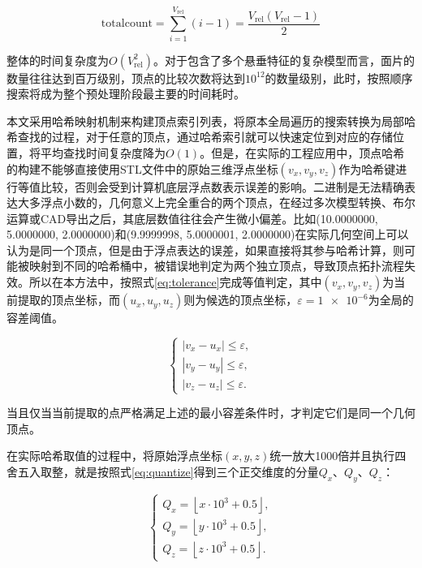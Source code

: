 \begin{equation}
\mathrm{totalcount}=\sum_{i=1}^{V_{\mathrm{rel}}}(i-1)=\frac{V_{\mathrm{rel}}(V_{\mathrm{rel}}-1)}{2} \label{eq:totalcount}
\end{equation}

整体的时间复杂度为$O(V_{\mathrm{rel}}^{2})$。对于包含了多个悬垂特征的复杂模型而言，面片的数量往往达到百万级别，顶点的比较次数将达到$10^{12}$的数量级别，此时，按照顺序搜索将成为整个预处理阶段最主要的时间耗时。

本文采用哈希映射机制来构建顶点索引列表，将原本全局遍历的搜索转换为局部哈希查找的过程，对于任意的顶点，通过哈希索引就可以快速定位到对应的存储位置，将平均查找时间复杂度降为$O(1)$。但是，在实际的工程应用中，顶点哈希的构建不能够直接使用STL文件中的原始三维浮点坐标$(v_{x},v_{y},v_{z})$作为哈希键进行等值比较，否则会受到计算机底层浮点数表示误差的影响。二进制是无法精确表达大多浮点小数的，几何意义上完全重合的两个顶点，在经过多次模型转换、布尔运算或CAD导出之后，其底层数值往往会产生微小偏差。比如(\num{10.0000000}, \num{5.0000000}, \num{2.0000000})和(\num{9.9999998}, \num{5.0000001}, \num{2.0000000})在实际几何空间上可以认为是同一个顶点，但是由于浮点表达的误差，如果直接将其参与哈希计算，则可能被映射到不同的哈希桶中，被错误地判定为两个独立顶点，导致顶点拓扑流程失效。所以在本方法中，按照式\eqref{eq:tolerance}完成等值判定，其中$(v_{x},v_{y},v_{z})$为当前提取的顶点坐标，而$(u_{x},u_{y},u_{z})$则为候选的顶点坐标，$\varepsilon=\num{1e-6}$为全局的容差阈值。

\begin{equation}
\begin{cases}
\left|v_x-u_x\right|\le\varepsilon,\\[6pt]
\left|v_y-u_y\right|\le\varepsilon,\\[6pt]
\left|v_z-u_z\right|\le\varepsilon.
\end{cases} \label{eq:tolerance}
\end{equation}

当且仅当当前提取的点严格满足上述的最小容差条件时，才判定它们是同一个几何顶点。

在实际哈希取值的过程中，将原始浮点坐标$(x,y,z)$统一放大\num{1000}倍并且执行四舍五入取整，就是按照式\eqref{eq:quantize}得到三个正交维度的分量$Q_{x}$、$Q_{y}$、$Q_{z}$：

\begin{equation}
\begin{cases}
Q_x=\left\lfloor x\cdot 10^3+0.5\right\rfloor,\\[6pt]
Q_y=\left\lfloor y\cdot 10^3+0.5\right\rfloor,\\[6pt]
Q_z=\left\lfloor z\cdot 10^3+0.5\right\rfloor.
\end{cases} \label{eq:quantize}
\end{equation}

